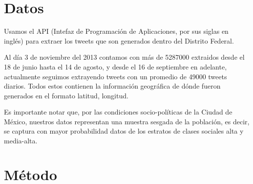 \documentclass{article}
\begin{document}
	\section{Datos}
		Usamos el API (Intefaz de Programación de Aplicaciones, por sus siglas en inglés) para extraer los tweets que son generados dentro del Distrito Federal.

		Al día 3 de noviembre del 2013 contamos con más de 5287000 extraidos desde el 18 de junio hasta el 14 de agosto, y desde el 16 de septiembre en adelante, actualmente seguimos extrayendo tweets con un promedio de 49000 tweets diarios. Todos estos contienen la información geográfica de dónde fueron generados en el formato latitud, longitud.

		Es importante notar que, por las condiciones socio-políticas de la Ciudad de México, nuestros datos representan una muestra sesgada de la población, es decir, se captura con mayor probabilidad datos de los estratos de clases sociales alta y media-alta. 

	\section{Método}
\end{document}
